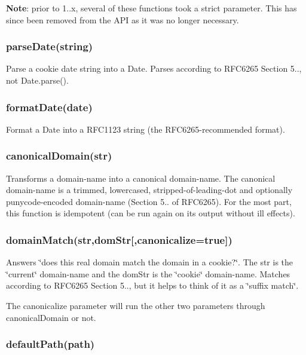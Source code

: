 {\bfseries Note}\+: prior to 1..\+x, several of these functions took a {\ttfamily strict} parameter. This has since been removed from the A\+PI as it was no longer necessary.

\subsubsection*{{\ttfamily parse\+Date(string)}}

Parse a cookie date string into a {\ttfamily Date}. Parses according to R\+F\+C6265 Section 5.., not {\ttfamily Date.\+parse()}.

\subsubsection*{{\ttfamily format\+Date(date)}}

Format a Date into a R\+F\+C1123 string (the R\+F\+C6265-\/recommended format).

\subsubsection*{{\ttfamily canonical\+Domain(str)}}

Transforms a domain-\/name into a canonical domain-\/name. The canonical domain-\/name is a trimmed, lowercased, stripped-\/of-\/leading-\/dot and optionally punycode-\/encoded domain-\/name (Section 5.. of R\+F\+C6265). For the most part, this function is idempotent (can be run again on its output without ill effects).

\subsubsection*{{\ttfamily domain\+Match(str,dom\+Str\mbox{[},canonicalize=true\mbox{]})}}

Answers \char`\"{}does this real domain match the domain in a cookie?\char`\"{}. The {\ttfamily str} is the \char`\"{}current\char`\"{} domain-\/name and the {\ttfamily dom\+Str} is the \char`\"{}cookie\char`\"{} domain-\/name. Matches according to R\+F\+C6265 Section 5.., but it helps to think of it as a \char`\"{}suffix match\char`\"{}.

The {\ttfamily canonicalize} parameter will run the other two parameters through {\ttfamily canonical\+Domain} or not.

\subsubsection*{{\ttfamily default\+Path(path)}}


